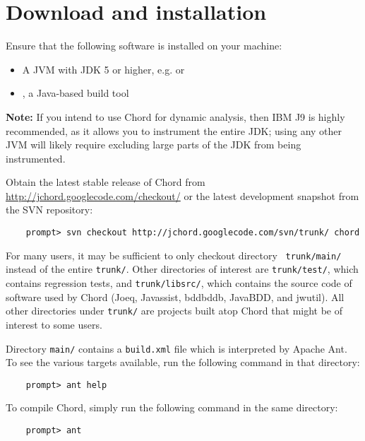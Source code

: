 \section{Download and installation}
\label{sec:download-and-installation}

Ensure that the following software is installed on your machine:

\begin{itemize}
\item
A JVM with JDK 5 or higher, e.g.
 or
\item
{}, a Java-based build tool
\end{itemize}

{\bf Note:} If you intend to use Chord for dynamic analysis, then
IBM J9 is highly recommended, as it allows you to instrument
the entire JDK; using any other JVM will likely require excluding
large parts of the JDK from being instrumented.

Obtain the latest stable release of Chord from \url{http://jchord.googlecode.com/checkout/}
or the latest development snapshot from the SVN repository: 

\begin{verbatim}
    prompt> svn checkout http://jchord.googlecode.com/svn/trunk/ chord
\end{verbatim}
For many users, it may be sufficient to only checkout directory {\tt
  trunk/main/} instead of the entire {\tt trunk/}.  Other directories
of interest are {\tt trunk/test/}, which contains regression tests,
and {\tt trunk/libsrc/}, which contains the source code of software
used by Chord (Joeq, Javassist, bddbddb, JavaBDD, and jwutil).  All
other directories under {\tt trunk/} are projects built atop Chord
that might be of interest to some users.

Directory {\tt main/} contains a {\tt build.xml} file which is
interpreted by Apache Ant.  To see the various targets available, run
the following command in that directory:

\begin{verbatim}
    prompt> ant help
\end{verbatim}

\noindent To compile Chord, simply run the following command in the same
directory:

\begin{verbatim}
    prompt> ant 
\end{verbatim}

